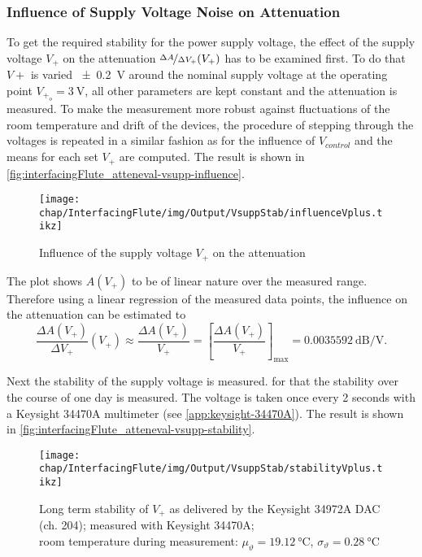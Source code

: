 \subsubsection{Influence of Supply Voltage Noise on Attenuation}
To get the required stability for the power supply voltage, the effect of the supply voltage $V_+$ on the attenuation $\nicefrac{\Delta A}{\Delta V_+} (V_+)$ has to be examined first. To do that $V+$ is varied \SI{\pm0.2}{\volt} around the nominal supply voltage at the operating point $V_{+_o}=\SI{3}{\volt}$, all other parameters are kept constant and the attenuation is measured. To make the measurement more robust against fluctuations of the room temperature and drift of the devices, the procedure of stepping through the voltages is repeated in a similar fashion as for the influence of $V_{control}$ and the means for each set $V_+$ are computed. The result is shown in \autoref{fig:interfacingFlute_atteneval-vsupp-influence}.

\begin{figure}[tb]
	\centering
	\texttt{[image: chap/InterfacingFlute/img/Output/VsuppStab/influenceVplus.tikz]}
	\caption{Influence of the supply voltage $V_+$ on the attenuation}
	\label{fig:interfacingFlute_atteneval-vsupp-influence}
\end{figure}

The plot shows $A(V_+)$ to be of linear nature over the measured range.
Therefore using a linear regression of the measured data points, the influence on the attenuation can be estimated to
\begin{equation}
\frac{\Delta A(V_+)}{\Delta V_+}(V_+) 
\approx \frac{\Delta A(V_+)}{V_+} 
= \left[\frac{\Delta A(V_+)}{V_+}\right]_\text{max}
=\SI{0.0035592}{\dB\per\volt}.
\end{equation}

Next the stability of the supply voltage is measured.
for that the stability over the course of one day is measured. The voltage is taken once every 2 seconds with a Keysight 34470A multimeter (see \autoref{app:keysight-34470A}). The result is shown in \autoref{fig:interfacingFlute_atteneval-vsupp-stability}.

\begin{figure}[tb]
	\centering
	\texttt{[image: chap/InterfacingFlute/img/Output/VsuppStab/stabilityVplus.tikz]}
	\caption{Long term stability of $V_{+}$ as delivered by the Keysight 34972A DAC (ch. 204); measured with Keysight 34470A;\\room temperature during measurement: $\mu_\vartheta=\SI{19.12}{\degreeCelsius}$, $\sigma_\vartheta=\SI{0.28}{\degreeCelsius}$}
	\label{fig:interfacingFlute_atteneval-vsupp-stability}
\end{figure}

